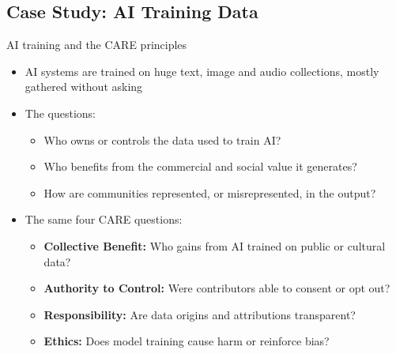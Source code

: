 \documentclass[aspectratio=169]{beamer}
\begin{document}
\subsection{Case Study: AI Training Data}

\begin{frame}{AI training and the CARE principles}
\begin{itemize}
  \item AI systems are trained on huge text, image and audio collections, mostly gathered without asking
  \item The questions:
    \begin{itemize}
      \item Who owns or controls the data used to train AI?
      \item Who benefits from the commercial and social value it generates?
      \item How are communities represented, or misrepresented, in the output?
    \end{itemize}
  \item The same four CARE questions:
    \begin{itemize}
      \item \textbf{Collective Benefit:} Who gains from AI trained on public or cultural data?
      \item \textbf{Authority to Control:} Were contributors able to consent or opt out?
      \item \textbf{Responsibility:} Are data origins and attributions transparent?
      \item \textbf{Ethics:} Does model training cause harm or reinforce bias?
    \end{itemize}
\end{itemize}
\end{frame}
\end{document}

